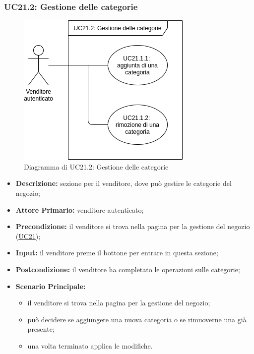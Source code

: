         \subsubsection{UC21.2: Gestione delle categorie}
        \label{sec:UC21.2}
        \begin{figure}[!ht]
            \caption{Diagramma di UC21.2: Gestione delle categorie}
            \vspace{10px}
            \includegraphics[scale=0.5]{../../../Images/AnalisiRequisiti/UC21.2}
            \centering
        \end{figure}
        \begin{itemize}
            \item \textbf{Descrizione:} sezione per il venditore, dove può gestire le categorie del negozio;
            \item \textbf{Attore Primario:} venditore autenticato;
            \item \textbf{Precondizione:} il venditore si trova nella pagina per la gestione del negozio (\hyperref[sec:UC21]{UC21});
            \item \textbf{Input:} il venditore preme il bottone per entrare in questa sezione;
            \item \textbf{Postcondizione:} il venditore ha completato le operazioni sulle categorie;
            \item \textbf{Scenario Principale:} 
                \begin{itemize}
                    \item il venditore si trova nella pagina per la gestione del negozio;
                    \item può decidere se aggiungere una nuova categoria o se rimuoverne una già presente;
                    \item una volta terminato applica le modifiche.
                \end{itemize}
        \end{itemize}
